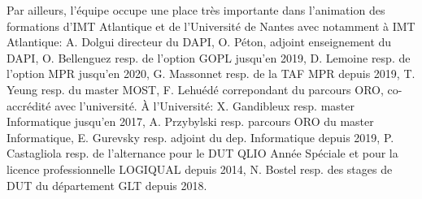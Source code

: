 Par ailleurs, l'équipe occupe une place très importante dans l'animation des formations d'IMT Atlantique et de l'Université de Nantes avec notamment à IMT Atlantique: 
A. Dolgui directeur du DAPI, 
O. Péton, adjoint enseignement du DAPI, 
O. Bellenguez resp. de l'option GOPL jusqu'en 2019, 
D. Lemoine resp. de l'option MPR jusqu'en 2020, 
G. Massonnet resp. de la TAF MPR depuis 2019, 
T. Yeung resp. du master MOST,
F. Lehuédé correpondant du parcours ORO, co-accrédité avec l'université.
\`A l'Université: X. Gandibleux resp. master Informatique jusqu'en 2017, 
A. Przybylski resp. parcours ORO du master Informatique,
E. Gurevsky resp. adjoint du dep. Informatique depuis 2019,
P. Castagliola resp. de l'alternance pour le DUT QLIO Année Spéciale et pour la licence professionnelle LOGIQUAL depuis 2014,
N. Bostel resp. des stages de DUT du département GLT depuis 2018.




